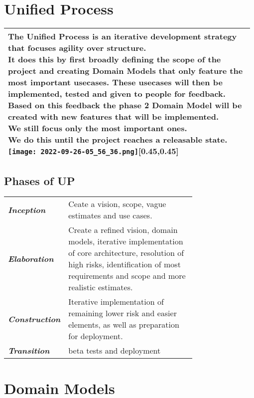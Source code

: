 \documentclass[main.tex,fontsize=8pt,paper=a4,paper=portrait,DIV=calc,]{scrartcl}
\begin{document}
\begin{table}[h!]
\section{Unified Process}
\begin{tabular}{|m{0.975\linewidth}|}
\hline
\minipg{
The Unified Process is an iterative development strategy that focuses agility over structure.\newline
It does this by first broadly defining the scope of the project and creating Domain Models that only feature the most important usecases.
These usecases will then be implemented, tested and given to people for feedback.\newline
Based on this feedback the phase 2 Domain Model will be created with new features that will be implemented.\newline We still focus only the most important ones.\newline
We do this until the project reaches a releasable state. \\}
{\texttt{[image: 2022-09-26-05\_56\_36.png]}}[0.45,0.45]\\
\hline
\end{tabular}
\subsection{Phases of UP}
\begin{tabular}{|m{0,205\linewidth}|m{0.75\linewidth}|}
\hline
\textbf{\emph{Inception}} & Ceate a vision, scope, vague estimates and use cases.\\
\textbf{\emph{Elaboration}} & Create a refined vision, domain models, iterative implementation of core architecture, resolution of high risks, identification of most requirements and scope and more realistic estimates.\\
\textbf{\emph{Construction}} & Iterative implementation of remaining lower risk and easier elements, as well as preparation for deployment.\\
\textbf{\emph{Transition}} &beta tests and deployment \\
\hline
\end{tabular}
\section{Domain Models}

\end{table}
\end{document}
